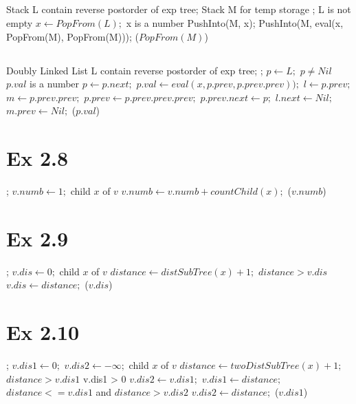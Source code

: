  \subsection{}
 \Prog\qq %
 \Global Stack L contain reverse postorder of exp tree; Stack M for temp storage\qq
{}; \p
\While L is not empty \Do\p
$x \leftarrow PopFrom(L);$\p
\If x is a number \Then \p
PushInto(M, x);\p
\Else\p
PushInto(M, eval(x, PopFrom(M), PopFrom(M)));\p
\Endif\p
\Endwhile\p
\Return($PopFrom(M)$)\qq
\Fini 

\subsection{}
\Prog\qq     %
 \Global Doubly Linked List L contain reverse postorder of exp tree; \qq
 ; \p
 $p \leftarrow L;$\p
\While $p \neq Nil$ \Do\p
\If $p.val$ is a number \Then \p
$p \leftarrow p.next;$\p
\Else\p
$p.val \leftarrow eval(x, p.prev, p.prev.prev));$\p
$l \leftarrow p.prev;$\p
$m \leftarrow p.prev.prev;$\p
$p.prev \leftarrow p.prev.prev.prev;$\p
$p.prev.next \leftarrow p;$\p
$l.next \leftarrow Nil;$\p
$m.prev \leftarrow Nil;$\p
\Endif\p
\Endwhile\p
\Return($p.val$)\qq
\Fini 


\section{Ex 2.8}
\Prog\qq  
{}; \p
$v.numb \leftarrow 1;$\p
\Foreach child $x$ of $v$ \Do\p
$v.numb \leftarrow v.numb + countChild(x);$\p
\Endfor\p
\Return($v.numb$)\qq
\Fini 

\section{Ex 2.9}
\Prog\qq  
{}; \p
$v.dis \leftarrow 0;$\p
\Foreach child $x$ of $v$ \Do\p
$distance \leftarrow distSubTree(x) + 1;$\p
\If $distance > v.dis$ \Then\p
$v.dis \leftarrow distance;$\p
\Endif\p
\Endfor\p
\Return($v.dis$)\qq
\Fini 


\section{Ex 2.10}
\Prog\qq 
{}; \p
$v.dis1 \leftarrow 0;$\p
$v.dis2 \leftarrow -\infty;$\p
\Foreach child $x$ of $v$ \Do\p
$distance \leftarrow twoDistSubTree(x) + 1;$\p
\If $distance > v.dis1$ \Then\p
\If v.dis1 > 0 \Then\p
$v.dis2 \leftarrow v.dis1;$\p
\Endif\p
$v.dis1 \leftarrow distance;$\p
\Elseif $distance <= v.dis1$ and  $distance > v.dis2$ \Then\p
$v.dis2 \leftarrow distance;$\p
\Endif\p
\Endfor\p
\Return($v.dis1$)\qq
\Fini 



